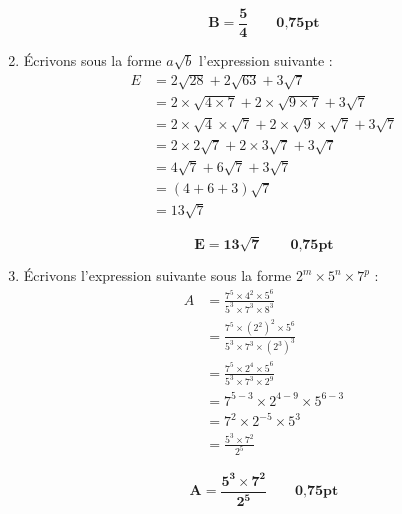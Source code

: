 \documentclass[12pt,a4paper]{article}
\begin{document}
\begin{enumerate}
\begin{tcolorbox}[colback=yellow!20, colframe=black, sharp corners]
    \[
    \mathbf{B = \frac{5}{4}}\quad\quad     \textbf{0,75pt}
    \]
\end{tcolorbox}

\item Écrivons sous la forme \( a\sqrt{b} \) l’expression suivante :
\[
\begin{aligned}
    E &= 2\sqrt{28} + 2\sqrt{63} + 3\sqrt{7} \\[6pt]
    &= 2 \times \sqrt{4 \times 7} + 2 \times \sqrt{9 \times 7} + 3\sqrt{7} \\[6pt]
    &= 2 \times \sqrt{4} \times \sqrt{7} + 2 \times \sqrt{9} \times \sqrt{7} + 3\sqrt{7} \\[6pt]
    &= 2 \times 2\sqrt{7} + 2 \times 3\sqrt{7} + 3\sqrt{7} \\[6pt]
    &= 4\sqrt{7} + 6\sqrt{7} + 3\sqrt{7} \\[6pt]
    &= (4 + 6 + 3) \sqrt{7} \\[6pt]
    &= 13\sqrt{7}
\end{aligned}
\]

\begin{tcolorbox}[colback=yellow!20, colframe=black, sharp corners]
    \[
    \mathbf{E = 13\sqrt{7}}\quad\quad     \textbf{0,75pt}
    \]
\end{tcolorbox}
\item Écrivons l’expression suivante sous la forme \( 2^m \times 5^n \times 7^p \) :
\[
\begin{aligned}
    A &= \frac{7^5 \times 4^2 \times 5^6}{5^3 \times 7^3 \times 8^3} \\[6pt]
    &= \frac{7^5 \times (2^2)^2 \times 5^6}{5^3 \times 7^3 \times (2^3)^3} \\[6pt]
    &= \frac{7^5 \times 2^4 \times 5^6}{5^3 \times 7^3 \times 2^9} \\[6pt]
    &= 7^{5-3} \times 2^{4-9} \times 5^{6-3} \\[6pt]
    &= 7^2 \times 2^{-5} \times 5^3 \\[6pt]
    &= \frac{5^3 \times 7^2}{2^5}
\end{aligned}
\]

\begin{tcolorbox}[colback=yellow!20, colframe=black, sharp corners]
    \[
    \mathbf{A = \frac{5^3 \times 7^2}{2^5}}\quad\quad     \textbf{0,75pt}
    \]
\end{tcolorbox}

\end{enumerate}
\end{document}
